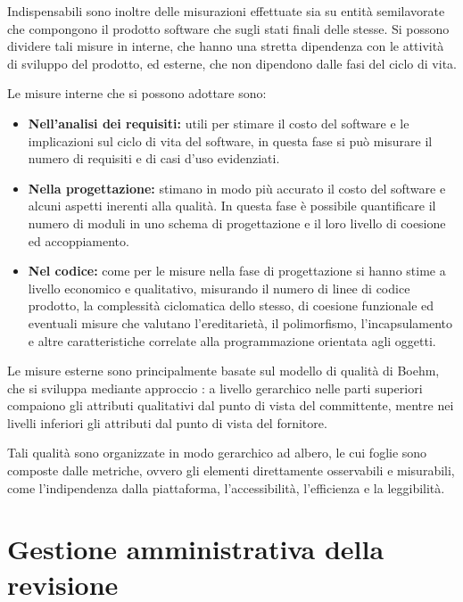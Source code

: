 Indispensabili sono inoltre delle misurazioni effettuate sia su entità semilavorate che compongono il prodotto software che sugli stati finali delle stesse. Si possono dividere tali misure in interne, che hanno una stretta dipendenza con le attività di sviluppo del prodotto, ed esterne, che non dipendono dalle fasi del ciclo di vita.

Le misure interne che si possono adottare sono:
\begin{itemize}

\item \textbf{Nell'analisi dei requisiti:} utili per stimare il costo del software e le implicazioni sul ciclo di vita del software, in questa fase si può misurare il numero di requisiti e di casi d'uso evidenziati.

\item \textbf{Nella progettazione:} stimano in modo più accurato il costo del software e alcuni aspetti inerenti alla qualità. In questa fase è possibile quantificare il numero di moduli in uno schema di progettazione e il loro livello di coesione ed accoppiamento.

\item \textbf{Nel codice:} come per le misure nella fase di progettazione si hanno stime a livello economico e qualitativo, misurando il numero di linee di codice prodotto, la complessità ciclomatica dello stesso, di coesione funzionale ed eventuali misure  che valutano l'ereditarietà, il polimorfismo, l'incapsulamento e altre caratteristiche correlate alla programmazione orientata agli oggetti.
\end{itemize}

Le misure esterne sono principalmente basate sul modello di qualità di Boehm, che si sviluppa mediante approccio : a livello gerarchico nelle parti superiori compaiono gli attributi qualitativi dal punto di vista del committente, mentre nei livelli inferiori gli attributi dal punto di vista del fornitore.

Tali qualità sono organizzate in modo gerarchico ad albero, le cui foglie sono composte dalle metriche, ovvero gli elementi direttamente osservabili e misurabili, come l'indipendenza dalla piattaforma, l'accessibilità, l'efficienza e la leggibilità.
\clearpage

\section{Gestione amministrativa della revisione}

